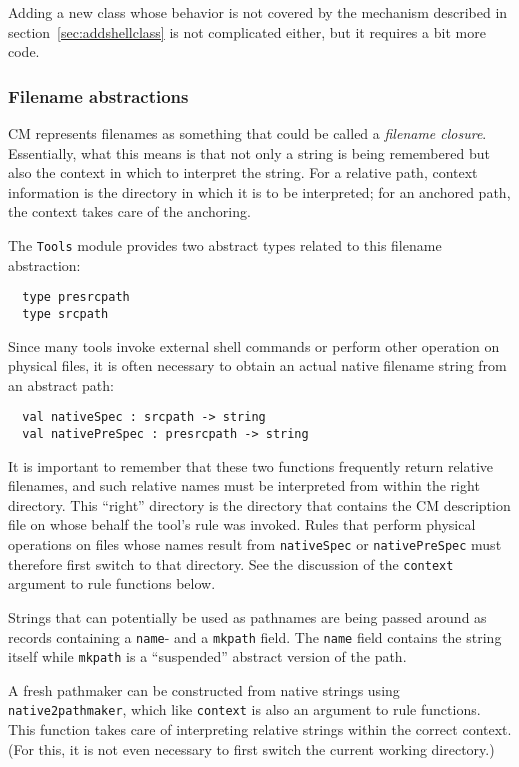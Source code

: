 Adding a new class whose behavior is not covered by the mechanism
described in section~\ref{sec:addshellclass} is not complicated
either, but it requires a bit more code.

\subsubsection{Filename abstractions}

CM represents filenames as something that could be called a {\em
filename closure}.  Essentially, what this means is that not only a
string is being remembered but also the context in which to interpret
the string.  For a relative path, context information is the directory
in which it is to be interpreted; for an anchored path, the context
takes care of the anchoring.

The {\tt Tools} module provides two abstract types related to this
filename abstraction:

\begin{verbatim}
  type presrcpath
  type srcpath
\end{verbatim}

Since many tools invoke external shell commands or perform other
operation on physical files, it is often necessary to obtain an actual
native filename string from an abstract path:

\begin{verbatim}
  val nativeSpec : srcpath -> string
  val nativePreSpec : presrcpath -> string
\end{verbatim}

It is important to remember that these two functions frequently return
relative filenames, and such relative names must be interpreted from
within the right directory.  This ``right'' directory is the directory
that contains the CM description file on whose behalf the tool's rule
was invoked.  Rules that perform physical operations on files whose
names result from {\tt nativeSpec} or {\tt nativePreSpec} must
therefore first switch to that directory.  See the discussion of the
{\tt context} argument to rule functions below.

Strings that can potentially be used as pathnames are being passed
around as records containing a {\tt name}- and a {\tt mkpath} field.
The {\tt name} field contains the string itself while {\tt mkpath}
is a ``suspended'' abstract version of the path.

A fresh pathmaker can be constructed from native strings using {\tt
native2pathmaker}, which like {\tt context} is also an argument to
rule functions.  This function takes care of interpreting relative
strings within the correct context.  (For this, it is not even
necessary to first switch the current working directory.)

